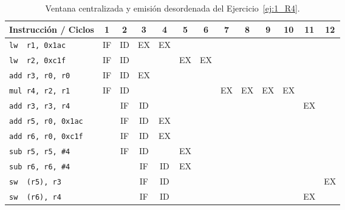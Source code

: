 \begin{ejercicio}
\begin{table}
\centering
\scriptsize
\begin{tabular}{|l|c|c|c|c|c|c|c|c|c|c|c|c|}
    \hline
    Instrucción / Ciclos & 1 & 2 & 3 & 4 & 5 & 6 & 7 & 8 & 9 & 10 & 11 & 12  \\
    \hline
    \verb|lw  r1, 0x1ac|     & IF & ID & EX & EX & & & & & & & & \\
    \hline        
    \verb|lw  r2, 0xc1f|     & IF & ID & & & EX & EX & & & & & & \\
    \hline           
    \verb|add r3, r0, r0|    & IF & ID & EX & & & & & & & & & \\
    \hline                        
    \verb|mul r4, r2, r1|    & IF & ID & & & & & EX & EX & EX & EX & & \\
    \hline            
    \verb|add r3, r3, r4|    & & IF & ID & & & & & & & & EX & \\
    \hline
    \verb|add r5, r0, 0x1ac| & & IF & ID & EX & & & & & & & & \\
    \hline
    \verb|add r6, r0, 0xc1f| & & IF & ID & EX & & & & & & & & \\
    \hline
    \verb|sub r5, r5, #4|    & & IF & ID & & EX & & & & & & & \\
    \hline            
    \verb|sub r6, r6, #4|    & & & IF & ID & EX & & & & & & & \\
    \hline
    \verb|sw  (r5), r3|      & & & IF & ID & & & & & & &  & EX \\
    \hline
    \verb|sw  (r6), r4|      & & & IF & ID & & & & & & & EX &  \\
    \hline
\end{tabular}
\caption{Ventana centralizada y emisión desordenada del Ejercicio~\ref{ej:1_R4}.}
\label{tab:ej1_R4_2}
\end{table}


\end{ejercicio}
